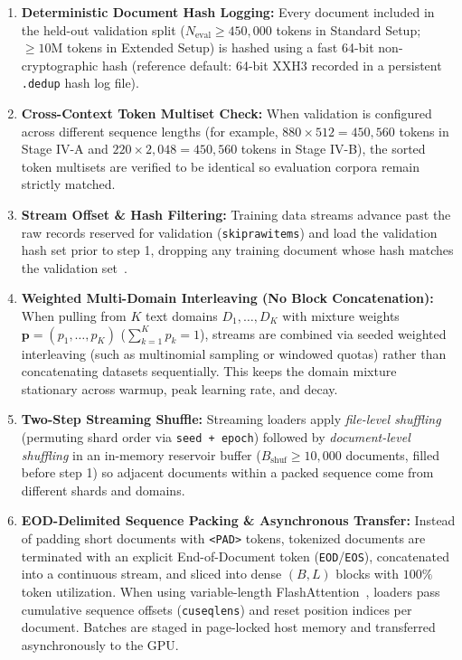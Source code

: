 \documentclass[11pt,a4paper]{article}
\renewcommand{\_}{\origunderscore\allowbreak}
\begin{document}
\begin{enumerate}[label=\textbf{D\arabic*.}, leftmargin=2.4em, itemsep=0.4em]
    \item \textbf{Deterministic Document Hash Logging:} Every document included in the held-out validation split ($N_{\text{eval}} \ge 450,000$ tokens in Standard Setup; $\ge 10\text{M}$ tokens in Extended Setup) is hashed using a fast 64-bit non-cryptographic hash (reference default: 64-bit XXH3 recorded in a persistent \texttt{.dedup} hash log file).
    \item \textbf{Cross-Context Token Multiset Check:} When validation is configured across different sequence lengths (for example, $880 \times 512 = 450,560$ tokens in Stage IV-A and $220 \times 2,048 = 450,560$ tokens in Stage IV-B), the sorted token multisets are verified to be identical so evaluation corpora remain strictly matched.
    \item \textbf{Stream Offset \& Hash Filtering:} Training data streams advance past the raw records reserved for validation (\texttt{skip\_raw\_items}) and load the validation hash set prior to step 1, dropping any training document whose hash matches the validation set~\cite{penedo2024fineweb}.
    \item \textbf{Weighted Multi-Domain Interleaving (No Block Concatenation):} When pulling from $K$ text domains $D_1, \dots, D_K$ with mixture weights $\mathbf{p} = (p_1, \dots, p_K)$ ($\sum_{k=1}^{K} p_k = 1$), streams are combined via seeded weighted interleaving (such as multinomial sampling or windowed quotas) rather than concatenating datasets sequentially. This keeps the domain mixture stationary across warmup, peak learning rate, and decay.
    \item \textbf{Two-Step Streaming Shuffle:} Streaming loaders apply \textit{file-level shuffling} (permuting shard order via \texttt{seed + epoch}) followed by \textit{document-level shuffling} in an in-memory reservoir buffer ($B_{\text{shuf}} \ge 10,000$ documents, filled before step 1) so adjacent documents within a packed sequence come from different shards and domains.
    \item \textbf{EOD-Delimited Sequence Packing \& Asynchronous Transfer:} Instead of padding short documents with \texttt{<PAD>} tokens, tokenized documents are terminated with an explicit End-of-Document token (\texttt{EOD}/\texttt{EOS}), concatenated into a continuous stream, and sliced into dense $(B, L)$ blocks with $100\%$ token utilization. When using variable-length FlashAttention~\cite{dao2022flashattention}, loaders pass cumulative sequence offsets (\texttt{cu\_seqlens}) and reset position indices per document. Batches are staged in page-locked host memory and transferred asynchronously to the GPU.
\end{enumerate}
\end{document}
